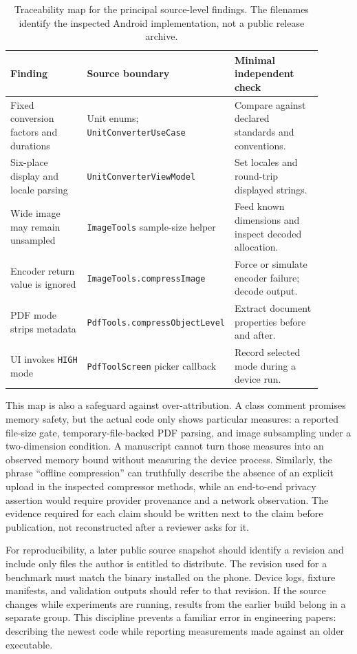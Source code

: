 \documentclass[10pt,letterpaper]{article}
\begin{document}
\begin{table}[H]
\centering\small
\caption{Traceability map for the principal source-level findings. The filenames identify the inspected Android implementation, not a public release archive.}
\label{tab:traceability}
\begin{tabular}{@{}>{\raggedright\arraybackslash}p{0.28\linewidth}>{\raggedright\arraybackslash}p{0.31\linewidth}>{\raggedright\arraybackslash}p{0.31\linewidth}@{}}
\toprule
Finding & Source boundary & Minimal independent check \\
\midrule
Fixed conversion factors and durations & Unit enums; \texttt{UnitConverterUseCase} & Compare against declared standards and conventions. \\
Six-place display and locale parsing & \texttt{UnitConverterViewModel} & Set locales and round-trip displayed strings. \\
Wide image may remain unsampled & \texttt{ImageTools} sample-size helper & Feed known dimensions and inspect decoded allocation. \\
Encoder return value is ignored & \texttt{ImageTools.compressImage} & Force or simulate encoder failure; decode output. \\
PDF mode strips metadata & \texttt{PdfTools.compressObjectLevel} & Extract document properties before and after. \\
UI invokes \texttt{HIGH} mode & \texttt{PdfToolScreen} picker callback & Record selected mode during a device run. \\
\bottomrule
\end{tabular}
\end{table}

This map is also a safeguard against over-attribution. A class comment promises memory safety, but the actual code only shows particular measures: a reported file-size gate, temporary-file-backed PDF parsing, and image subsampling under a two-dimension condition. A manuscript cannot turn those measures into an observed memory bound without measuring the device process. Similarly, the phrase ``offline compression'' can truthfully describe the absence of an explicit upload in the inspected compressor methods, while an end-to-end privacy assertion would require provider provenance and a network observation. The evidence required for each claim should be written next to the claim before publication, not reconstructed after a reviewer asks for it.

For reproducibility, a later public source snapshot should identify a revision and include only files the author is entitled to distribute. The revision used for a benchmark must match the binary installed on the phone. Device logs, fixture manifests, and validation outputs should refer to that revision. If the source changes while experiments are running, results from the earlier build belong in a separate group. This discipline prevents a familiar error in engineering papers: describing the newest code while reporting measurements made against an older executable.
\end{document}
